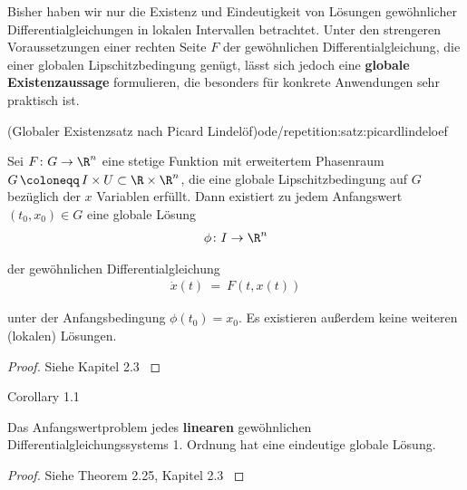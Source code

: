 \documentclass[letterpaper,10pt,german]{jupyterBook}
\begin{document}
\par
Bisher haben wir nur die Existenz und Eindeutigkeit von Lösungen gewöhnlicher Differentialgleichungen in lokalen Intervallen betrachtet.
Unter den strengeren Voraussetzungen einer rechten Seite \(F\) der gewöhnlichen Differentialgleichung, die einer globalen Lipschitzbedingung genügt, lässt sich jedoch eine \textbf{globale Existenzaussage} formulieren, die besonders für konkrete Anwendungen sehr praktisch ist.
\begin{theorem}{(Globaler Existenzsatz nach Picard Lindelöf)}{ode/repetition:satz:picardlindeloef}



\par
Sei \(F\colon G\to\R^n\) eine stetige Funktion mit erweitertem Phasenraum \(G \, \coloneqq \, I \times U \subset \R\times\R^n\), die eine globale Lipschitzbedingung auf \(G\) bezüglich der \(x\) Variablen erfüllt.
Dann existiert zu jedem Anfangswert \((t_0,x_0) \in G\) eine globale Lösung
\begin{align*}
\phi \colon I \to \R^n
\end{align*}
\par
der gewöhnlichen Differentialgleichung
\begin{align*}
\dot{x}(t) \ = \ F(t,x(t))
\end{align*}
\par
unter der Anfangsbedingung \(\phi(t_0)=x_0\).
Es existieren außerdem keine weiteren (lokalen) Lösungen.
\end{theorem}

\begin{proof}
 Siehe Kapitel 2.3 \cite{Kna13}
\end{proof}
\label{ode/repetition:cor:eindeutigkeitlinear}
\begin{emphBox}{}{}{Corollary 1.1}



\par
Das Anfangswertproblem jedes \textbf{linearen} gewöhnlichen Differentialgleichungssystems 1. Ordnung hat eine eindeutige globale Lösung.
\end{emphBox}

\begin{proof}
 Siehe Theorem 2.25, Kapitel 2.3 \cite{Kna13}
\end{proof}
\end{document}
